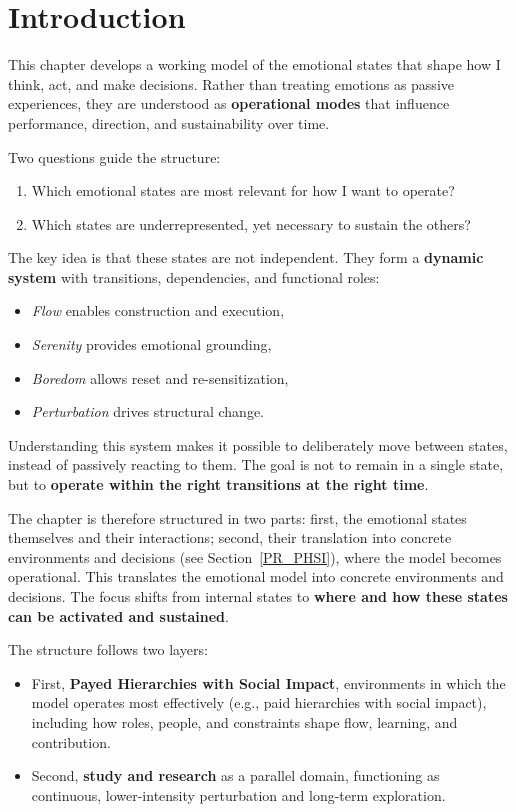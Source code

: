 \section{Introduction}

This chapter develops a working model of the emotional states that shape how I think, act, and make decisions. Rather than treating emotions as passive experiences, they are understood as \textbf{operational modes} that influence performance, direction, and sustainability over time.

Two questions guide the structure:

\begin{enumerate}
	\item Which emotional states are most relevant for how I want to operate?
	\item Which states are underrepresented, yet necessary to sustain the others?
\end{enumerate}

The key idea is that these states are not independent. They form a \textbf{dynamic system} with transitions, dependencies, and functional roles:
\begin{itemize}
	\item \textit{Flow} enables construction and execution,
	\item \textit{Serenity} provides emotional grounding,
	\item \textit{Boredom} allows reset and re-sensitization,
	\item \textit{Perturbation} drives structural change.
\end{itemize}

Understanding this system makes it possible to deliberately move between states, instead of passively reacting to them. The goal is not to remain in a single state, but to \textbf{operate within the right transitions at the right time}.

The chapter is therefore structured in two parts: first, the emotional states themselves and their interactions; second, their translation into concrete environments and decisions (see Section~\ref{PR_PHSI}), where the model becomes operational. This translates the emotional model into concrete environments and decisions. The focus shifts from internal states to \textbf{where and how these states can be activated and sustained}.

The structure follows two layers:
\begin{itemize}
	\item First, \textbf{Payed Hierarchies with Social Impact}, environments in which the model operates most effectively (e.g., paid hierarchies with social impact), including how roles, people, and constraints shape flow, learning, and contribution.
	\item Second, \textbf{study and research} as a parallel domain, functioning as continuous, lower-intensity perturbation and long-term exploration.
\end{itemize}

